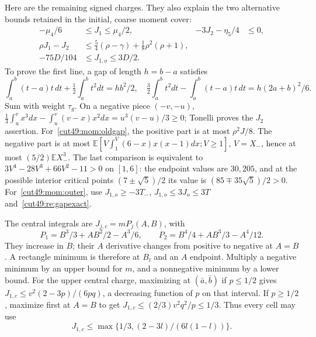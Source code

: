 \documentclass[11pt,a4paper]{article}
\numberwithin{equation}{section}
\theoremstyle{definition}
\theoremstyle{remark}
\newcommand{\E}{\mathbb E}
\begin{document}
Here are the remaining signed charges. They also explain the two
alternative bounds retained in the initial, coarse moment cover:
\begin{align}
 -\mu_4/6&\le J_1\le\mu_4/2,&
 -3J_2-\eta_5/4&\le0,                                  \label{cut49:mom:gap-signs}\\
 \rho J_1-J_2&\le\tfrac54(\rho-\gamma)+\tfrac18\rho^2(\rho+1),
                                                              \label{cut49:mom:oldgap}\\
 -75D/104&\le J_{1,o}\le3D/2.                           \label{cut49:mom:outer}
\end{align}
To prove the first line, a gap of length $h=b-a$ satisfies
\[
 \int_a^b(t-a)t\,dt+\tfrac12\int_a^bt^2dt=hb^2/2,\quad
 \tfrac32\int_a^bt^2dt-\int_a^b(t-a)t\,dt=h(2a+b)^2/6.
\]
Sum with weight $\tau_g$. On a negative piece $(-v,-u)$,
$\frac13\int_u^v x^3dx-\int_u^v(v-x)x^2dx=u^3(v-u)/3\ge0$;
Tonelli proves the $J_2$ assertion. For~\eqref{cut49:mom:oldgap}, the positive
part is at most $\rho^2J/8$. The negative part is at most
$\E[V\int_1^V(6-x)x(x-1)dx;V\ge1]$, $V=X_-$, hence at most
$(5/2)\E X_-^3$. The last comparison is equivalent to
$3V^4-28V^3+66V^2-11>0$ on $[1,6]$: the endpoint values are $30,205$,
and at the possible interior critical points $(7\pm\sqrt5)/2$ its value
is $(85\mp35\sqrt5)/2>0$.
For~\eqref{cut49:mom:outer}, use $J_{1,o}\ge-3T_-$,
$J_{1,o}\le3J_o\le3T$ and~\eqref{cut49:re:gapexact}.

The central integrals are $J_{j,c}=mP_j(A,B)$, with
\[
 P_1=B^3/3+AB^2/2-A^3/6,\qquad
 P_2=B^4/4+AB^3/3-A^4/12.
\]
They increase in $B$; their $A$ derivative changes from positive to negative
at $A=B$. A rectangle minimum is therefore at $B_l$ and an $A$ endpoint.
Multiply a negative minimum by an upper bound for $m$, and a nonnegative
minimum by a lower bound. For the upper central charge, maximizing at
$(\bar a,\bar b)$ if $p\le1/2$ gives
$J_{1,c}\le v^2(2-3p)/(6pq)$, a decreasing function of $p$ on that interval.
If $p\ge1/2$, maximize first at $A=B$ to get
$J_{1,c}\le(2/3)v^2q^2/p\le1/3$. Thus every cell may use
\begin{equation}\label{cut49:mom:central-upper}
 J_{1,c}\le\max\{1/3,(2-3l)/(6l(1-l))\}.
\end{equation}
\end{document}
